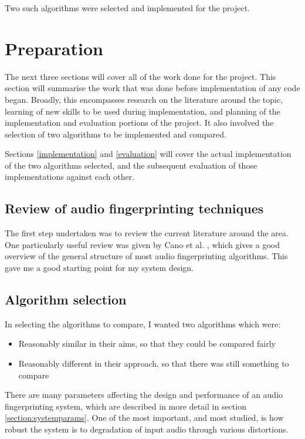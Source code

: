 \documentclass[12pt,a4paper,twoside,openright]{report}
\begin{document}
Two such algorithms were selected and implemented for the project.



\chapter{Preparation}
\label{preparation}

The next three sections will cover all of the work done for the project. This section will summarise the work that was done before implementation of any code began. Broadly, this encompasses research on the literature around the topic, learning of new skills to be used during implementation, and planning of the implementation and evaluation portions of the project. It also involved the selection of two algorithms to be implemented and compared.

Sections \ref{implementation} and \ref{evaluation} will cover the actual implementation of the two algorithms selected, and the subsequent evaluation of those implementations against each other.


\section{Review of audio fingerprinting techniques}

The first step undertaken was to review the current literature around the area. One particularly useful review was given by Cano et al. \cite{Cano02}, which gives a good overview of the general structure of most audio fingerprinting algorithms. This gave me a good starting point for my system design.


\section{Algorithm selection}
\label{section:algoselection}

In selecting the algorithms to compare, I wanted two algorithms which were:

\begin{itemize}
  \item Reasonably similar in their aims, so that they could be compared fairly
  \item Reasonably different in their approach, so that there was still something to compare
\end{itemize}

There are many parameters affecting the design and performance of an audio fingerprinting system, which are described in more detail in section \ref{section:systemparams}. One of the most important, and most studied, is how robust the system is to degradation of input audio through various distortions. 
\end{document}
